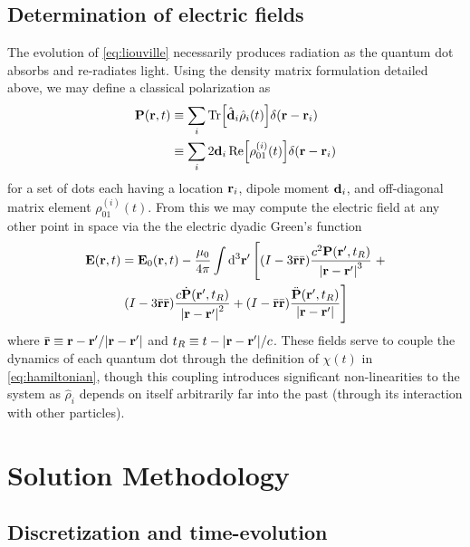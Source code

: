 \documentclass[conference]{IEEEtran}
\begin{document}
\subsection{Determination of electric fields}

The evolution of \cref{eq:liouville} necessarily produces radiation as the quantum dot absorbs and re-radiates light.
Using the density matrix formulation detailed above, we may define a classical polarization as
\begin{equation}
  \begin{aligned}
    \vb{P}(\vb{r}, t) &\equiv \sum_i \Tr[\hat{\vb{d}}_i \hat{\rho}_i(t)] \delta(\vb{r} - \vb{r}_i) \\
                      &\equiv \sum_i 2 \vb{d}_i \Re\!\qty[\rho_{01}^{(i)}(t)] \delta(\vb{r} - \vb{r}_i)
  \end{aligned}
  \label{eq:polarization}
\end{equation}
for a set of dots each having a location $\vb{r}_i$, dipole moment $\vb{d}_i$, and off-diagonal matrix element $\rho_{01}^{(i)}(t)$.
From this we may compute the electric field at any other point in space via the the electric dyadic Green's function\cite{Rothwell2008}
\begin{gather}
    \vb{E}(\vb{r}, t) = \vb{E}_0(\vb{r}, t) - \frac{\mu_0}{4\pi} \int \dd[3]{\vb{r}'} \left [ 
      \qty(I - 3\bar{\vb{r}}\bar{\vb{r}}) \frac{c^2 \vb{P}(\vb{r}', t_R)}{\abs{\vb{r} - \vb{r}'}^3} \right . + \nonumber \\
      \left . \qty(I - 3\bar{\vb{r}}\bar{\vb{r}}) \frac{c \dot{\vb{P}}(\vb{r}', t_R)}{\abs{\vb{r} - \vb{r}'}^2} +
      \qty(I -  \bar{\vb{r}}\bar{\vb{r}}) \frac{\ddot{\vb{P}}(\vb{r}', t_R)}{\abs{\vb{r} - \vb{r}'}} \right ] 
  \label{eq:efield}
\end{gather}
where $\bar{\vb{r}} \equiv \vb{r} - \vb{r}'/\abs{\vb{r} - \vb{r}'}$ and $t_R \equiv t - \abs{\vb{r} - \vb{r}'}/c$.
These fields serve to couple the dynamics of each quantum dot through the definition of $\chi(t)$ in \cref{eq:hamiltonian}, though this coupling introduces significant non-linearities to the system as $\hat{\rho}_i$ depends on itself arbitrarily far into the past (through its interaction with other particles).



\section{Solution Methodology}
\subsection{Discretization and time-evolution}
\end{document}
